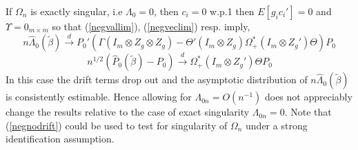 \documentclass[11pt, fleqn]{article}
\begin{document}
If $\Omega_n$ is exactly singular, i.e $\Lambda_{0}=0$, then  $c_i=0$ w.p.1 then $E[g_ic_i']=0$ and $\Upsilon=0_{m\times m}$ so that (\ref{negvallim}), (\ref{negveclim}) resp. imply,
\begin{equation} \label{negnodrift} n\hat{\Lambda}_0(\tilde{\beta})\overset{d}{\rightarrow}P_0'\left(\Gamma(I_m\otimes Z_g\otimes Z_g)- \Theta'(I_m \otimes Z_{g})\Omega_+^*(I_{m}\otimes Z_{g}')\Theta\right)P_0\end{equation}
\begin{equation}\label{negeigvec} \hspace{1pt}  n^{1/2}(\hat{P}_{0}(\tilde{\beta})-P_0)\overset{d}{\rightarrow}  \Omega_+^*(I_{m}\otimes Z_{g}')\Theta P_0 \end{equation}
In this case the drift terms drop out and the asymptotic distribution of $ n\hat{\Lambda}_0(\tilde{\beta})$ is consistently estimable. Hence allowing for $\Lambda_{0n}=O(n^{-1})$ does not appreciably change the results relative to the case of exact singularity $\Lambda_{0n}=0$. Note that (\ref{negnodrift}) could be used to test for singularity of $\Omega_n$ under a strong identification assumption.
\end{document}
